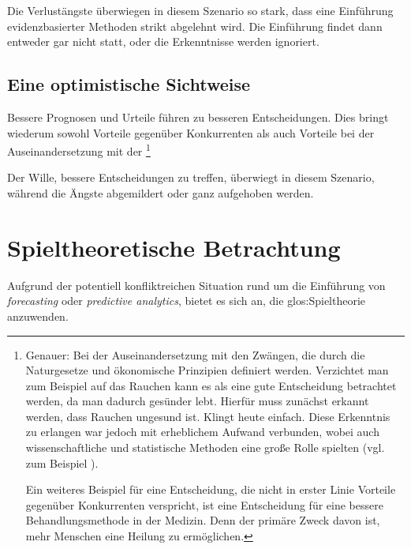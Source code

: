 Die Verlustängste überwiegen in diesem Szenario so stark, dass eine Einführung
evidenzbasierter Methoden strikt abgelehnt wird. Die Einführung findet dann
entweder gar nicht statt, oder die Erkenntnisse werden ignoriert.

\subsection{Eine optimistische Sichtweise}




Bessere Prognosen und Urteile führen zu besseren Entscheidungen. Dies bringt
wiederum sowohl Vorteile gegenüber Konkurrenten als auch Vorteile bei der
Auseinandersetzung mit der \grqq\footnote{
Genauer: Bei der Auseinandersetzung mit den Zwängen, die durch die Naturgesetze
und ökonomische Prinzipien definiert werden. Verzichtet man zum Beispiel auf das 
Rauchen kann es als eine gute Entscheidung betrachtet werden, da man dadurch
gesünder lebt. Hierfür muss zunächst erkannt werden, dass Rauchen ungesund ist.
Klingt heute einfach. Diese Erkenntnis zu erlangen war jedoch mit erheblichem
Aufwand verbunden, wobei auch wissenschaftliche und statistische Methoden
eine große Rolle spielten (vgl. zum Beispiel \cite{Proctor}).

Ein weiteres Beispiel für eine Entscheidung, die nicht in erster Linie Vorteile
gegenüber Konkurrenten verspricht, ist eine Entscheidung für eine bessere
Behandlungsmethode in der Medizin. Denn der primäre Zweck davon ist, 
mehr Menschen eine Heilung zu ermöglichen.
}

Der Wille, bessere Entscheidungen zu treffen, überwiegt in diesem Szenario, während
die Ängste abgemildert oder ganz aufgehoben werden.

\section{Spieltheoretische Betrachtung}


Aufgrund der potentiell konfliktreichen Situation rund um die Einführung von
\emph{forecasting} oder \emph{predictive analytics}, bietet es sich an, die
\gls{glos:Spieltheorie} anzuwenden.

